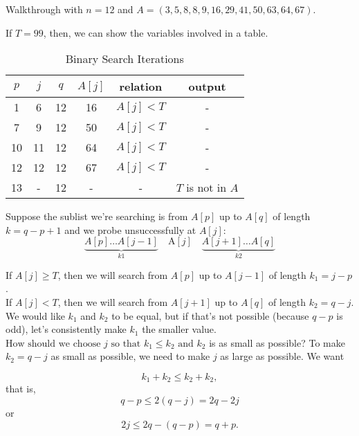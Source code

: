     Walkthrough with $n = 12$ and $A = (3, 5, 8, 8, 9, 16, 29, 41, 50, 63, 64, 67)$. 

    If $T=99$, then, we can show the variables involved in a table.
    \begin{table}[h!] 
        \label{bisearch1}
        \centering
        \begin{tabular}{cccccc}
        \toprule
        \( p \) & \( j \) & \( q \) & \( A[j] \) & relation     & output         \\
        \midrule
        1       & 6       & 12      & 16         & \( A[j] < T \) & -             \\
        7       & 9       & 12      & 50         & \( A[j] < T \) & -             \\
        10      & 11      & 12      & 64         & \( A[j] < T \) & -             \\
        12      & 12      & 12      & 67         & \( A[j] < T \) & -             \\
        13      & -       & 12      & -          & -              & \( T \) is not in \( A \) \\
        \bottomrule
        \end{tabular}
        \caption{Binary Search Iterations}
        \end{table}
        Suppose the sublist we're searching is from \( A[p] \) up to \( A[q] \) of length \( k = q - p + 1\) and we probe unsuccessfully at \( A[j] \):
        $$\underbrace{A[p]\ldots A[j-1]}_{k1}\quad\text{A}[j]\quad\underbrace{A[j+1]\ldots A[q]}_{k2}$$
        
        If \( A[j] \geq T \), then we will search from \( A[p] \) up to \( A[j-1] \) of length \( k_1 = j - p \). \\
        
        If \( A[j] < T \), then we will search from \( A[j+1] \) up to \( A[q] \) of length \( k_2 = q - j \). \\
        
        We would like \( k_1 \) and \( k_2 \) to be equal, but if that's not possible (because \( q - p \) is odd), let's consistently make \( k_1 \) the smaller value.
        $\text{How should we choose }  j  \text{ so that }  k_1 \leq k_2  \text{ and }  k_2$  is as small as possible?
        To make \( k_2 = q - j \) as small as possible, we need to make \( j \) as large as possible. We want
        
        \[ k_1 + k_2 \leq k_2 + k_2, \]
        that is,
        \[ q - p \leq 2(q - j) = 2q - 2j \]
        or
        \[ 2j \leq 2q - (q - p) = q + p. \]
        
